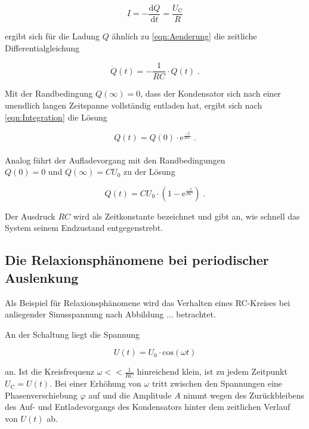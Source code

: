 \begin{equation}
    I = - \frac{\text{d}Q}{\text{d}t} = \frac{U_\text{C}}{R}
\end{equation}

ergibt sich für die Ladung $Q$ ähnlich zu \eqref{eqn:Aenderung}
 die zeitliche Differentialgleichung

\begin{equation}
    \dot{Q}(t) = - \frac{1}{RC} \cdot Q(t) \; \text{.}
\end{equation}

Mit der Randbedingung $Q(\infty) = 0$, dass der Kondensator sich nach einer unendlich langen Zeitspanne
vollständig entladen hat, ergibt sich nach \eqref{eqn:Integration} die Lösung

\begin{equation}
    Q(t) = Q(0) \cdot \text{e}^{\frac{-t}{RC}} \; \text{.}
\end{equation} \\

Analog führt der Aufladevorgang mit den Randbedingungen $Q(0) = 0 \text{  und  } Q(\infty) = CU_0$
zu der Lösung

\begin{equation}
    Q(t) = CU_0 \cdot \left(1 - \text{e}^{\frac{-t}{RC}}\right) \; \text{.}
\end{equation}

Der Ausdruck $RC$ wird als Zeitkonstante bezeichnet und gibt an, wie schnell das System seinem 
Endzustand entgegenstrebt.

\subsection{Die Relaxionsphänomene bei periodischer Auslenkung}

Als Beispiel für Relaxionsphänomene wird das Verhalten eines RC-Kreises bei anliegender
Sinusspannung nach Abbildung ... betrachtet. 

An der Schaltung liegt die Spannung

\begin{equation}
    U(t) = U_0 \cdot \text{cos}(\omega t)
\end{equation}

an. Ist die Kreisfrequenz $\omega << \frac{1}{RC}$ hinreichend klein, ist zu jedem Zeitpunkt
$U_\text{C} = U(t)$. Bei einer Erhöhung von $\omega$ tritt zwischen den Spannungen eine
Phasenverschiebung $\varphi$ auf und die Amplitude $A$ nimmt wegen des Zurückbleibens des
Auf- und Entladevorgangs des Kondensators hinter dem zeitlichen Verlauf von $U(t)$ ab. 

